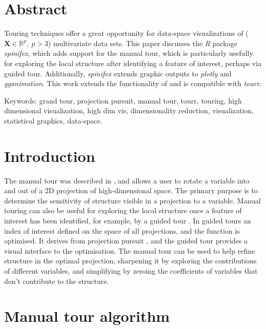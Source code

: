 \documentclass{monashthesis}
\begin{document}
\hypertarget{abstract-1}{%
\section{Abstract}\label{abstract-1}}

Touring techniques offer a great opportunity for data-space visualizations of (\(\textbf{X} \in \mathbb{R}^p,~p > 3\)) multivariate data sets. This paper discusses the \emph{R} package \emph{spinifex}, which adds support for the manual tour, which is particularly usefully for exploring the local structure after identifying a feature of interest, perhaps via guided tour. Additionally, \emph{spinifex} extends graphic outputs to \emph{plotly} and \emph{gganimation}. This work extends the functionality of and is compatible with \emph{tourr}.

Keywords: grand tour, projection pursuit, manual tour, tourr, touring, high dimensional visualization, high dim vis, dimensionality reduction, visualization, statistical graphics, data-space.

\hypertarget{introduction}{%
\section{Introduction}\label{introduction}}

The manual tour was described in \textcite{cook_manual_1997}, and allows a user to rotate a variable into and out of a 2D projection of high-dimensional space. The primary purpose is to determine the sensitivity of structure visible in a projection to a variable. Manual touring can also be useful for exploring the local structure once a feature of interest has been identified, for example, by a guided tour \autocite{hurley_analyzing_1990}. In guided tours an index of interest defined on the space of all projections, and the function is optimised. It derives from projection pursuit \autocite{friedman_projection_1974}, and the guided tour provides a visual interface to the optimisation. The manual tour can be used to help refine structure in the optimal projection, sharpening it by exploring the contributions of different variables, and simplifying by zeroing the coefficients of variables that don't contribute to the structure.

\hypertarget{manual-tour-algorithm}{%
\section{Manual tour algorithm}\label{manual-tour-algorithm}}
\end{document}
